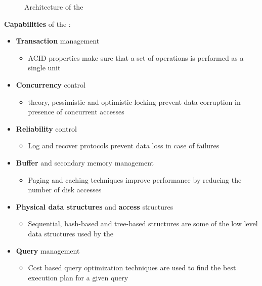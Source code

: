 \documentclass[english]{article}
\begin{document}
\begin{figure}[htbp]
  \centering
  \bigskip
  \bigskip
  \caption{Architecture of the \DBMS}
  \label{fig:architecture}
\end{figure}

\bigskip
\textbf{Capabilities} of the \DBMS:

\begin{itemize}
  \item \textbf{Transaction} management
        \begin{itemize}[label=\(\rightarrow\)]
          \item ACID properties make sure that a set of operations is performed as a single unit
        \end{itemize}
  \item \textbf{Concurrency} control
        \begin{itemize}[label=\(\rightarrow\)]
          \item \CC theory, pessimistic and optimistic locking prevent data corruption in presence of concurrent accesses
        \end{itemize}
  \item \textbf{Reliability} control
        \begin{itemize}[label=\(\rightarrow\)]
          \item Log and recover protocols prevent data loss in case of failures
        \end{itemize}
  \item \textbf{Buffer} and secondary memory management
        \begin{itemize}[label=\(\rightarrow\)]
          \item Paging and caching techniques improve performance by reducing the number of disk accesses
        \end{itemize}
  \item \textbf{Physical data structures} and \textbf{access} structures
        \begin{itemize}[label=\(\rightarrow\)]
          \item Sequential, hash-based and tree-based structures are some of the low level data structures used by the \DBMS
        \end{itemize}
  \item \textbf{Query} management
        \begin{itemize}[label=\(\rightarrow\)]
          \item Cost based query optimization techniques are used to find the best execution plan for a given query
        \end{itemize}
\end{itemize}
\end{document}
